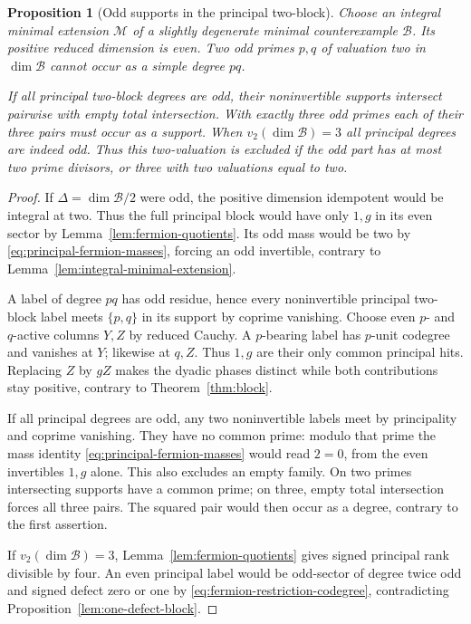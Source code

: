 \documentclass[11pt,a4paper]{article}
\numberwithin{equation}{section}
\newtheorem{proposition}[theorem]{Proposition}
\theoremstyle{remark}
\newcommand{\M}{\mathcal M}
\begin{document}
\begin{proposition}[Odd supports in the principal two-block]\label{fam:M:4.7}
\label{three:odd-reduced}\label{lem:fermion-no-pair-degree}\label{lem:principal-fermion-two}\label{prop:cubic-two-exclusion}
Choose an integral minimal extension $\M$ of a slightly degenerate
minimal counterexample $\mathcal B$. Its positive reduced dimension is even. Two odd primes $p,q$ of
valuation two in $\dim\mathcal B$ cannot occur as a simple degree $pq$.

If all principal two-block degrees are odd, their noninvertible
supports intersect pairwise with empty total intersection. With
exactly three odd primes each of their three pairs must occur as a
support. When $v_2(\dim\mathcal B)=3$ all principal degrees are
indeed odd. Thus this two-valuation is excluded if the odd part has
at most two prime divisors, or three with two valuations equal to two.
\end{proposition}
\begin{proof}
If $\Delta=\dim\mathcal B/2$ were odd, the positive dimension
idempotent would be integral at two. Thus the full principal block
would have only $1,g$ in its even sector by Lemma~\ref{lem:fermion-quotients}.
Its odd mass would be two by \eqref{eq:principal-fermion-masses},
forcing an odd invertible, contrary to Lemma~\ref{lem:integral-minimal-extension}.

A label of degree $pq$ has odd residue, hence every noninvertible
principal two-block label meets $\{p,q\}$ in its support by coprime
vanishing. Choose even $p$- and $q$-active columns $Y,Z$ by reduced
Cauchy. A $p$-bearing label has $p$-unit codegree and vanishes at
$Y$; likewise at $q,Z$. Thus $1,g$ are their only common principal
hits. Replacing $Z$ by $gZ$ makes the dyadic phases distinct while
both contributions stay positive, contrary to Theorem~\ref{thm:block}.

If all principal degrees are odd, any two noninvertible labels
meet by principality and coprime vanishing. They have no common
prime: modulo that prime the mass identity
\eqref{eq:principal-fermion-masses} would read $2=0$, from the
even invertibles $1,g$ alone. This also excludes an empty family.
On two primes intersecting supports have a common prime; on three,
empty total intersection forces all three pairs. The squared pair
would then occur as a degree, contrary to the first assertion.

If $v_2(\dim\mathcal B)=3$, Lemma~\ref{lem:fermion-quotients}
gives signed principal rank divisible by four. An even principal label
would be odd-sector of degree twice odd and signed defect zero or one
by \eqref{eq:fermion-restriction-codegree}, contradicting
Proposition~\ref{lem:one-defect-block}.
\end{proof}
\end{document}
